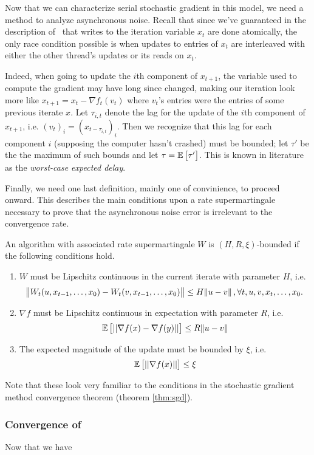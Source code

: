 Now that we can characterize serial stochastic gradient in this model, we need
a method to analyze asynchronous noise. Recall that since we've guaranteed in
the description of \hogwild\ that writes to the iteration variable $x_t$ are
done atomically, the only race condition possible is when updates to entries of
$x_t$ are interleaved with either the other thread's updates or its reads on
$x_t$.

Indeed, when going to update the $i$th component of $x_{t+1}$, the variable used
to compute the gradient may have long since changed, making our iteration look
more like $x_{t+1} = x_t - \nabla f_t(v_t)$ where $v_t$'s entries were the
entries of some previous iterate $x$. Let $\tau_{i,t}$ denote the lag for the
update of the $i$th component of $x_{t+1}$, i.e. $(v_t)_i = ( x_{t-\tau_{i,t}}
)_i$. Then we recognize that this lag for each component $i$ (supposing the
computer hasn't crashed) must be bounded; let $\tau'$ be the the maximum of such
bounds and let $\tau = \mathbb{E}\left[\tau'\right]$. This is known in literature as the {\it
worst-case expected delay}.

Finally, we need one last definition, mainly one of convinience, to proceed
onward. This describes the main conditions upon a rate supermartingale necessary
to prove that the asynchronous noise error is irrelevant to the convergence
rate.
\begin{definition}
  An algorithm with associated rate supermartingale $W$ is $(H, R, \xi)$-bounded
  if the following conditions hold.
  \begin{enumerate}[(1)]
    \item $W$ must be Lipschitz continuous in the current iterate with parameter
      $H$, i.e.
      \[
        \norm{W_t(u, x_{t-1}, \dots, x_0) - W_t(v, x_{t-1}, \dots, x_0)}
        \leq
        H\norm{u-v}, \forall t, u, v, x_t, \dots, x_0.
      \]
    \item $\nabla f$ must be Lipschitz continuous in expectation with parameter
      $R$, i.e.
      \[
        \mathbb{E}\left[||\nabla f(x) - \nabla f(y)||\right] \leq R\norm{u-v}
      \]
    \item The expected magnitude of the update must be bounded by $\xi$, i.e.
      \[
        \mathbb{E}\left[||\nabla f(x)||\right] \leq \xi
      \]
  \end{enumerate}
  Note that these look very familiar to the conditions in the stochastic
  gradient method convergence theorem (theorem \ref{thm:sgd}).
\end{definition}

\subsubsection{Convergence of \hogwild}

Now that we have
